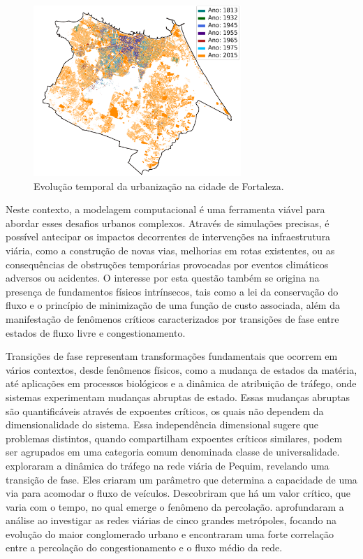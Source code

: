 \documentclass{article}
\begin{document}
\begin{figure}[H]
    \centering
    \includegraphics[width=0.7\textwidth]{img/urbanizacao.png}
    \caption{Evolução temporal da urbanização na cidade de Fortaleza.}
    \label{fig:urbanizacao}
\end{figure}


Neste contexto, a modelagem computacional é uma ferramenta viável para abordar esses desafios urbanos complexos. Através de simulações precisas, é possível antecipar os impactos decorrentes de intervenções na infraestrutura viária, como a construção de novas vias, melhorias em rotas existentes, ou as consequências de obstruções temporárias provocadas por eventos climáticos adversos ou acidentes. O interesse por esta questão também se origina na presença de fundamentos físicos intrínsecos, tais como a lei da conservação do fluxo e o princípio de minimização de uma função de custo associada, além da manifestação de fenômenos críticos caracterizados por transições de fase entre estados de fluxo livre e congestionamento. 


Transições de fase representam transformações fundamentais que ocorrem em vários contextos, desde fenômenos físicos, como a mudança de estados da matéria, até aplicações em processos biológicos e a dinâmica de atribuição de tráfego, onde sistemas experimentam mudanças abruptas de estado. Essas mudanças abruptas são quantificáveis através de expoentes críticos, os quais não dependem da dimensionalidade do sistema. Essa independência dimensional sugere que problemas distintos, quando compartilham expoentes críticos similares, podem ser agrupados em uma categoria comum denominada classe de universalidade. 
\citet{Li2014,Zeng2018} exploraram a dinâmica do tráfego na rede viária de Pequim, revelando uma transição de fase. Eles criaram um parâmetro que determina a capacidade de uma via para acomodar o fluxo de veículos. Descobriram que há um valor crítico, que varia com o tempo, no qual emerge o fenômeno da percolação. \citet{Ambhl2023} aprofundaram a análise ao investigar as redes viárias de cinco grandes metrópoles, focando na evolução do maior conglomerado urbano e encontraram uma forte correlação entre a percolação do congestionamento e o fluxo médio da rede.
\end{document}
